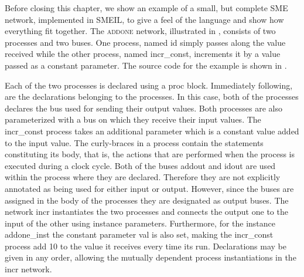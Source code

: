 Before closing this chapter, we show an example of a small, but complete SME
network, implemented in SMEIL, to give a feel of the language and show how
everything fit together. The \textsc{addone} network, illustrated in
, consists of two processes and two buses. One process, named
{\ttfamily id} simply passes along the value received while the other process,
named {\ttfamily incr_const}, increments it by a value passed as a constant
parameter. The source code for the example is shown in .


Each of the two processes is declared using a {\ttfamily proc}
block. Immediately following, are the declarations belonging to the
processes. In this case, both of the processes declares the bus used for sending
their output values. Both processes are also parameterized with a bus on which
they receive their input values. The {\ttfamily incr\_const} process takes an
additional parameter which is a constant value added to the input value. The
curly-braces in a process contain the statements constituting its body, that is,
the actions that are performed when the process is executed during a clock
cycle. Both of the buses {\ttfamily addout} and {\ttfamily idout} are used
within the process where they are declared. Therefore they are not explicitly
annotated as being used for either input or output. However, since the buses are
assigned in the body of the processes they are designated as output buses. The
network {\ttfamily incr} instantiates the two processes and connects the output
one to the input of the other using instance parameters. Furthermore, for the
instance {\ttfamily addone\_inst} the constant parameter {\ttfamily val} is also
set, making the {\ttfamily incr\_const} process add 10 to the value it receives
every time its run. Declarations may be given in any order, allowing the
mutually dependent process instantiations in the {\ttfamily incr} network.







